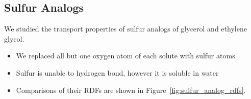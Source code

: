 \documentclass{article}
\begin{document}
  \subsection*{Sulfur Analogs}
  
  We studied the transport properties of sulfur analogs of glycerol and ethylene glycol.
  \begin{itemize}
    \item We replaced all but one oxygen atom of each solute with sulfur atoms
  	\item Sulfur is unable to hydrogen bond, however it is soluble in water  %
  	\item Comparisons of their RDFs are shown in Figure~\ref{fig:sulfur_analog_rdfs}.
  \end{itemize}
  
\end{document}
